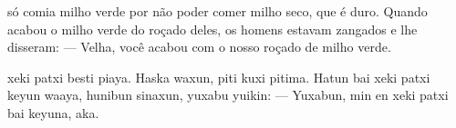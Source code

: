 \mbox{}\vspace*{\fill}



 só comia milho
verde por não poder comer
milho seco, que é duro.
Quando acabou o milho verde
do roçado deles, os homens
estavam zangados
e lhe disseram:\break
--- Velha, você acabou com o
nosso roçado de milho verde.

\vspace{2em}

 xeki patxi besti piaya.
Haska waxun, piti kuxi pitima.
Hatun bai xeki patxi keyun waaya,
hunibun sinaxun, yuxabu yuikin:\break
--- Yuxabun, min en xeki
patxi bai keyuna, aka.

\vspace*{\fill}

